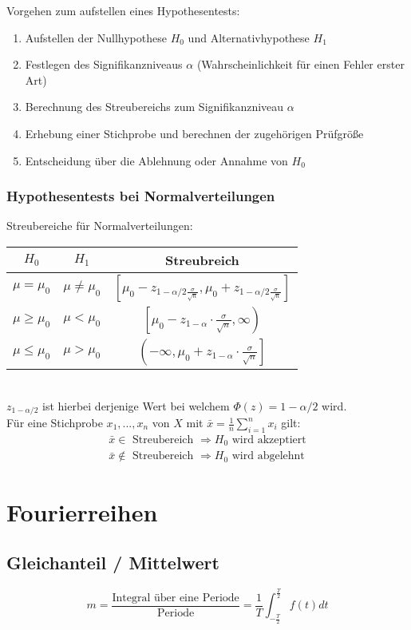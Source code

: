 \documentclass[12pt]{article}
\begin{document}
Vorgehen zum aufstellen eines Hypothesentests:
\begin{enumerate}
	\item Aufstellen der Nullhypothese $H_0$ und Alternativhypothese $H_1$
	\item Festlegen des Signifikanzniveaus $\alpha$ (Wahrscheinlichkeit für einen Fehler erster Art)
	\item Berechnung des Streubereichs zum Signifikanzniveau $\alpha$
	\item Erhebung einer Stichprobe und berechnen der zugehörigen Prüfgröße
	\item Entscheidung über die Ablehnung oder Annahme von $H_0$
\end{enumerate}
\subsubsection{Hypothesentests bei Normalverteilungen}
Streubereiche für Normalverteilungen:\\
\begin{tabular}{|c|c|c|}
	\hline
	\textbf{$H_0$} & \textbf{$H_1$} & \textbf{Streubreich}\\\hline
	$\mu=\mu_0$ & $\mu\neq\mu_0$ & $\left[\mu_0-z_{1-\alpha/2\frac{\sigma}{\sqrt{n}}}, \mu_0+z_{1-\alpha/2\frac{\sigma}{\sqrt{n}}}\right]$\\\hline
	$\mu\geq\mu_0$ & $\mu<\mu_0$ & $\left[\mu_0-z_{1-\alpha}\cdot\frac{\sigma}{\sqrt{n}}, \infty\right)$\\\hline
	$\mu\leq\mu_0$ & $\mu>\mu_0$ & $\left(-\infty, \mu_0+z_{1-\alpha}\cdot \frac{\sigma}{\sqrt{n}}\right]$\\\hline
\end{tabular}\\
$z_{1-\alpha/2}$ ist hierbei derjenige Wert bei welchem $\Phi (z) = 1-\alpha/2$ wird.\\ 
Für eine Stichprobe $x_1,...,x_n$ von $X$ mit $\bar{x}=\frac{1}{n}\sum_{i=1}^nx_i$ gilt:
\begin{gather*}
	\bar{x}\in \text{ Streubereich }\Rightarrow H_0 \text{ wird akzeptiert}\\
	\bar{x}\notin \text{ Streubereich }\Rightarrow H_0 \text{ wird abgelehnt}
\end{gather*}
\section{Fourierreihen}
\subsection{Gleichanteil / Mittelwert}
\begin{equation*}
	m=\frac{\text{Integral über eine Periode}}{\text{Periode}}=\frac{1}{T}\int_{-\frac{T}{2}}^{\frac{T}{2}}f(t)dt
\end{equation*}
\end{document}
